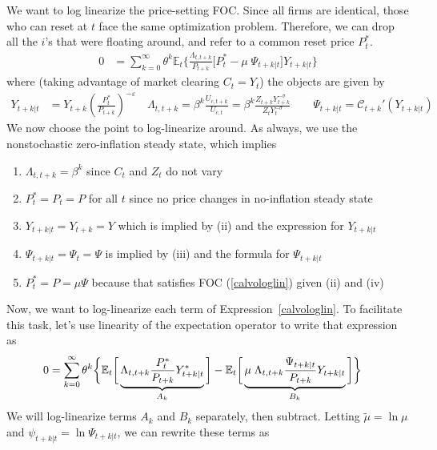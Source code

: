 \documentclass[12pt]{article}
\theoremstyle{plain}
\theoremstyle{definition}
\theoremstyle{remark}
\newcommand{\calC}{\mathcal{C}}
\newcommand{\E}{\mathbb{E}}
\begin{document}
We want to log linearize the price-setting FOC.
Since all firms are identical, those who can reset at $t$ face the
same optimization problem. Therefore, we can drop all the $i$'s that
were floating around, and refer to a common reset price $P_t^*$.
\begin{align}
  0
  &=
  \sum_{k=0}^\infty
  \theta^k
  \E_t\bigg\{
  \frac{\Lambda_{t,t+k}}{P_{t+k}}
  \bigg[
  P_t^*
  - \mu\;\Psi_{t+k|t}
  \bigg]Y_{t+k|t}
  \bigg\}
  \label{calvologlin}
\end{align}
where (taking advantage of market clearing $C_t=Y_t$) the objects
are given by
\begin{align*}
  Y_{t+k|t}
  &=
  Y_{t+k}
  \left(
  \frac{P_t^*}{P_{t+k}}
  \right)^{-\varepsilon}
  \quad
  \Lambda_{t,t+k} = \beta^k\frac{U_{c,t+k}}{U_{c,t}}
  = \beta^k\frac{Z_{t+k}Y_{t+k}^{-\sigma}}{Z_{t}Y_{t}^{-\sigma}}
  \qquad
  \Psi_{t+k|t} =
  \calC_{t+k}'(Y_{t+k|t})
\end{align*}
We now choose the point to log-linearize around. As always, we use
the nonstochastic zero-inflation steady state, which implies
\begin{enumerate}[label=(\roman*)]
  \item $\Lambda_{t,t+k} = \beta^k$ since $C_t$ and $Z_t$ do not
    vary
  \item $P_t^*=P_{t}=P$ for all $t$ since no price changes in
    no-inflation steady state
  \item $Y_{t+k|t}=Y_{t+k}=Y$ which is implied by (ii) and the
    expression for $Y_{t+k|t}$
  \item $\Psi_{t+k|t}=\Psi_t=\Psi$ is implied by (iii) and the
    formula for $\Psi_{t+k|t}$
  \item $P_t^*=P=\mu\Psi$ because that satisfies
    FOC (\ref{calvologlin}) given (ii) and (iv)
\end{enumerate}
Now, we want to log-linearize each term of
Expression~\ref{calvologlin}. To facilitate this task, let's use
linearity of the expectation operator to write that expression as
\begin{align}
  0
  &=
  \sum_{k=0}^\infty
  \theta^k
  \bigg\{
  \E_t\bigg[
  \underbrace{%
    \Lambda_{t,t+k}
    \frac{P_t^*}{P_{t+k}}
    Y^*_{t+k|t}
  }_{A_k}
  \bigg]
  -
  \E_t\bigg[
  \underbrace{%
    \mu\;
    \Lambda_{t,t+k}
    \frac{\Psi_{t+k|t}}{P_{t+k}}
    Y_{t+k|t}
  }_{B_k}
  \bigg]
  \bigg\}
  \label{calvoAB}
\end{align}
We will log-linearize terms $A_k$ and $B_k$ separately, then
subtract. Letting $\tilde{\mu}=\ln\mu$ and
$\psi_{t+k|t}=\ln\Psi_{t+k|t}$, we can rewrite these terms as
\end{document}
